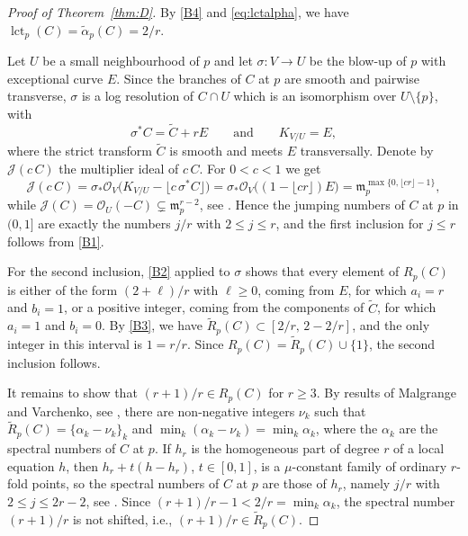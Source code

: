 \documentclass[11pt]{amsart}
\theoremstyle{definition}
\numberwithin{equation}{section}
\newcommand{\cO}{\mathcal{O}}
\newcommand{\cJ}{\mathcal{J}}
\newcommand{\tR}{\widetilde{R}}
\newcommand{\talpha}{\widetilde{\alpha}}
\newcommand{\gadd}[1]{#1}
\DeclareMathOperator{\lct}{lct}
\begin{document}
\begin{proof}[Proof of Theorem~\ref{thm:D}]
By \ref{B4} and \eqref{eq:lctalpha}, we have $\lct_p(C)=\talpha_p(C)=2/r$.

Let $U$ be a small neighbourhood of $p$ and let $\sigma\colon V\to U$ be the blow-up of $p$
with exceptional curve $E$.
Since the branches of $C$ at $p$ are smooth and pairwise transverse, $\sigma$ is a log
resolution of $C\cap U$ which is an isomorphism over $U\setminus\{p\}$, with
\[
\sigma^*C=\widetilde C+rE\qquad\text{and}\qquad K_{V/U}=E,
\]
where the strict transform $\widetilde C$ is smooth and meets $E$ transversally.
Denote by $\cJ(c\,C)$ the multiplier ideal of $c\,C$.
For $0<c<1$ we get
\[
\cJ(c\,C)=\sigma_*\cO_V\bigl(K_{V/U}-\lfloor c\,\sigma^*C\rfloor\bigr)
=\sigma_*\cO_V\bigl((1-\lfloor cr\rfloor)E\bigr)
=\mathfrak m_p^{\max\{0,\lfloor cr\rfloor-1\}},
\]
while $\cJ(C)=\cO_U(-C)\subsetneq\mathfrak m_p^{r-2}$, see \cite[Section~6]{PoBS}.
Hence the jumping numbers of $C$ at $p$ in $(0,1]$ are exactly the numbers $j/r$ with
$2\le j\le r$, and the first inclusion \gadd{for $j\le r$} follows from \ref{B1}.

For the second inclusion, \ref{B2} applied to $\sigma$ shows that every element of $R_p(C)$
is either of the form $(2+\ell)/r$ with $\ell\ge0$, coming from $E$, for which $a_i=r$ and
$b_i=1$, or a positive integer, coming from the components of $\widetilde C$, for which
$a_i=1$ and $b_i=0$.
By \ref{B3}, we have $\tR_p(C)\subset[2/r,\,2-2/r]$, and the only integer in this interval
is $1=r/r$.
Since $R_p(C)=\tR_p(C)\cup\{1\}$, the second inclusion follows.

It remains to show that $(r+1)/r\in R_p(C)$ for $r\ge3$.
By results of Malgrange \gadd{\cite{Ma}} and Varchenko, see \cite[(1)]{SaBP}, there are non-negative integers $\nu_k$ such that $\tR_p(C)=\{\alpha_k-\nu_k\}_k$ and $\min_k(\alpha_k-\nu_k)=\min_k\alpha_k$, where the $\alpha_k$ are the spectral numbers of $C$ at $p$.
If $h_r$ is the homogeneous part of degree $r$ of a local equation $h$, then $h_r+t(h-h_r)$, $t\in[0,1]$, is a $\mu$-constant family of ordinary $r$-fold points, so the spectral numbers of $C$ at $p$ are those of $h_r$, namely $j/r$ with $2\le j\le2r-2$, see \cite[Introduction and (1.1.20)]{SaBP}.
Since $(r+1)/r-1<2/r=\min_k\alpha_k$, the spectral number $(r+1)/r$ is not shifted, i.e., $(r+1)/r\in\tR_p(C)$.


\end{proof}
\end{document}
